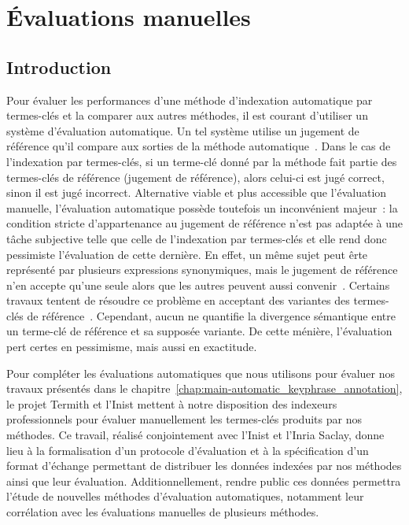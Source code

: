 \chapter{Évaluations manuelles}
\label{chap:main-manuelle_evaluation_of_keyphrase_annotation}

  \section{Introduction}
  \label{sec:main-automatic_evaluation_of_keyphrase_annotation-introduction}
    Pour évaluer les performances d'une méthode d'indexation automatique par
    termes-clés et la comparer aux autres méthodes, il est courant d'utiliser un
    système d'évaluation automatique. Un tel système utilise un jugement de
    référence qu'il compare aux sorties de la méthode
    automatique~\cite{voorhees2002philosophy}. Dans le cas de l'indexation par
    termes-clés, si un terme-clé donné par la méthode fait partie des
    termes-clés de référence (jugement de référence), alors celui-ci est jugé
    correct, sinon il est jugé incorrect. Alternative viable et plus accessible
    que l'évaluation manuelle, l'évaluation automatique possède toutefois un
    inconvénient majeur~: la condition stricte d'appartenance au jugement de
    référence n'est pas adaptée à une tâche subjective telle que celle de
    l'indexation par termes-clés et elle rend donc pessimiste l'évaluation de
    cette dernière. En effet, un même sujet peut êrte représenté par plusieurs
    expressions synonymiques, mais le jugement de référence n'en accepte qu'une
    seule alors que les autres peuvent aussi
    convenir~\cite{hasan2014state_of_the_art}. Certains travaux tentent de
    résoudre ce problème en acceptant des variantes des termes-clés de
    référence~\cite{zesch2009rprecision,kim2010rprecision}. Cependant, aucun ne
    quantifie la divergence sémantique entre un terme-clé de référence et sa
    supposée variante. De cette ménière, l'évaluation pert certes en pessimisme,
    mais aussi en exactitude.
    
    Pour compléter les évaluations automatiques que nous utilisons pour évaluer
    nos travaux présentés dans le
    chapitre~\ref{chap:main-automatic_keyphrase_annotation}, le projet Termith
    et l'Inist mettent à notre disposition des indexeurs professionnels pour
    évaluer manuellement les termes-clés produits par nos méthodes. Ce travail,
    réalisé conjointement avec l'Inist et l'Inria Saclay, donne lieu à la
    formalisation d'un protocole d'évaluation et à la spécification d'un format
    d'échange permettant de distribuer les données indexées par nos méthodes
    ainsi que leur évaluation. Additionnellement, rendre public ces données
    permettra l'étude de nouvelles méthodes d'évaluation automatiques,
    notamment leur corrélation avec les évaluations manuelles de plusieurs
    méthodes.

